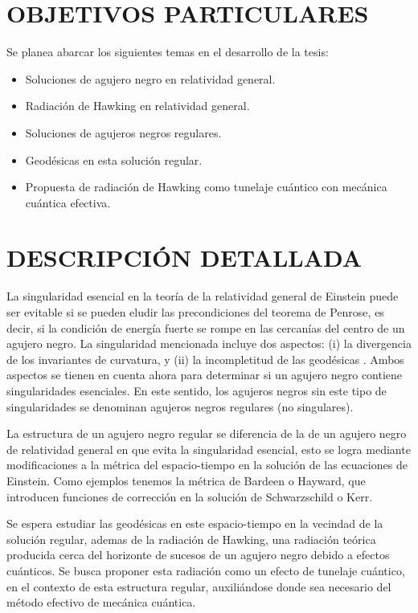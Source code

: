 \documentclass[a4paper,12pt]{article}
\begin{document}
\section*{OBJETIVOS PARTICULARES}
Se planea abarcar los siguientes temas en el desarrollo de la tesis:
\begin{itemize}
    \item Soluciones de agujero negro en relatividad general.
    \item Radiación de Hawking en relatividad general.
    \item Soluciones de agujeros negros regulares.
    \item Geodésicas en esta solución regular.
    \item Propuesta de radiación de Hawking como tunelaje cuántico con mecánica cuántica efectiva. 
\end{itemize}


\section*{DESCRIPCIÓN DETALLADA}
La singularidad esencial en la teoría de la relatividad general de Einstein puede ser evitable si se pueden eludir las precondiciones del teorema de Penrose, es decir, si la condición de energía fuerte se rompe en las cercanías del centro de un agujero negro. La singularidad mencionada  incluye dos aspectos: (i) la divergencia de los invariantes de curvatura, y (ii) la incompletitud de las geodésicas \cite{lan-2023}. Ambos aspectos se tienen en cuenta ahora para determinar si un agujero negro contiene singularidades esenciales. En este sentido, los agujeros negros sin este tipo de  singularidades  se denominan agujeros negros regulares (no singulares).


La estructura de un agujero negro regular se diferencia de la de un agujero negro de relatividad general en que evita la singularidad esencial, esto se logra mediante modificaciones a la métrica del espacio-tiempo en la solución de las ecuaciones de Einstein. Como ejemplos tenemos la métrica de Bardeen\cite{rodrigues-2018} o Hayward\cite{chiba-2017}, que introducen funciones de corrección en la solución de Schwarzschild o Kerr. 


Se espera estudiar las geodésicas en este espacio-tiempo en la vecindad de la solución regular, ademas de la  radiación de Hawking, una radiación teórica producida  cerca del horizonte de sucesos de un agujero negro debido a efectos cuánticos. Se busca proponer esta radiación como un efecto de tunelaje cuántico\cite{parikh-2000}, en el contexto de esta estructura regular, auxiliándose donde sea necesario del método efectivo de mecánica cuántica.
\end{document}
